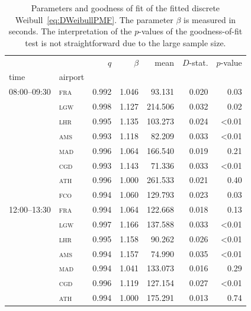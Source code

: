 \documentclass[final,review]{elsarticle}
\newcommand{\airp}[1]{\textcolor{#1}{\textsc{#1}}}
\begin{document}
\begin{table}
    \centering
    \caption{Parameters and goodness of fit of the fitted discrete Weibull~\eqref{eq:DWeibullPMF}. The parameter \(\beta\) is measured in seconds. The interpretation of the \(p\)-values of the goodness-of-fit test is not straightforward due to the large sample size.}
    \label{tab:fitted}
    \begin{tabular}{llrrrrr}
      \toprule
                   &             &   \(q\) & \(\beta\) &    mean & \(D\)-stat. & \(p\)-value \\
      time & airport &       &         &         &           &           \\
      \midrule
      08:00--09:30 & \airp{fra} & 0.992 &   1.046 &  93.131 &     0.020 &      0.03 \\
                   & \airp{lgw} & 0.998 &   1.127 & 214.506 &     0.032 &      0.02 \\
                   & \airp{lhr} & 0.995 &   1.135 & 103.273 &     0.024 &     <0.01 \\
                   & \airp{ams} & 0.993 &   1.118 &  82.209 &     0.033 &     <0.01 \\
                   & \airp{mad} & 0.996 &   1.064 & 166.540 &     0.019 &      0.21 \\
                   & \airp{cgd} & 0.993 &   1.143 &  71.336 &     0.033 &     <0.01 \\
                   & \airp{ath} & 0.996 &   1.000 & 261.533 &     0.021 &      0.40 \\
                   & \airp{fco} & 0.994 &   1.060 & 129.793 &     0.023 &      0.03 \\
      12:00--13:30 & \airp{fra} & 0.994 &   1.064 & 122.668 &     0.018 &      0.13 \\
                   & \airp{lgw} & 0.997 &   1.166 & 137.588 &     0.033 &     <0.01 \\
                   & \airp{lhr} & 0.995 &   1.158 &  90.262 &     0.026 &     <0.01 \\
                   & \airp{ams} & 0.994 &   1.157 &  74.990 &     0.035 &     <0.01 \\
                   & \airp{mad} & 0.994 &   1.041 & 133.073 &     0.016 &      0.29 \\
                   & \airp{cgd} & 0.996 &   1.119 & 127.154 &     0.027 &     <0.01 \\
                   & \airp{ath} & 0.994 &   1.000 & 175.291 &     0.013 &      0.74 \\

\end{tabular}
\end{table}
\end{document}
